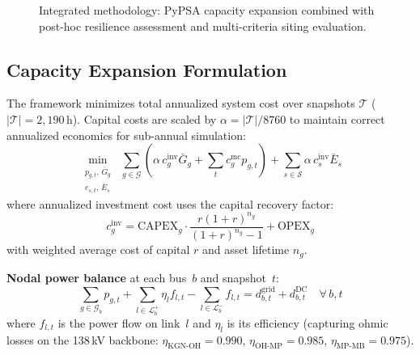 \documentclass[conference,10pt]{IEEEtran}
\begin{document}
\begin{figure}[htbp]
{
}
\caption{Integrated methodology: PyPSA capacity expansion combined with post-hoc resilience assessment and multi-criteria siting evaluation.}
\label{fig:workflow}
\end{figure}

\subsection{Capacity Expansion Formulation}

The framework minimizes total annualized system cost over snapshots $\mathcal{T}$ ($|\mathcal{T}| = 2{,}190$\,h). Capital costs are scaled by $\alpha = |\mathcal{T}|/8760$ to maintain correct annualized economics for sub-annual simulation:
\begin{equation}
\min_{\substack{p_{g,t},\, \bar{G}_g \\ e_{s,t},\, \bar{E}_s}} \;\sum_{g \in \mathcal{G}} \left(\alpha\, c_g^{\text{inv}} \bar{G}_g + \sum_{t} c_g^{\text{mc}} p_{g,t}\right) + \sum_{s \in \mathcal{S}} \alpha\, c_s^{\text{inv}} \bar{E}_s
\label{eq:obj}
\end{equation}
where annualized investment cost uses the capital recovery factor:
\begin{equation}
c_g^{\text{inv}} = \text{CAPEX}_g \cdot \frac{r(1+r)^{n_g}}{(1+r)^{n_g}-1} + \text{OPEX}_g
\label{eq:crf}
\end{equation}
with weighted average cost of capital $r$ and asset lifetime $n_g$.

\noindent\textbf{Nodal power balance} at each bus~$b$ and snapshot~$t$:
\begin{equation}
\sum_{g \in \mathcal{G}_b} p_{g,t} + \sum_{l \in \mathcal{L}_b^{+}} \eta_l f_{l,t} - \sum_{l \in \mathcal{L}_b^{-}} f_{l,t} = d_{b,t}^{\text{grid}} + d_{b,t}^{\text{DC}} \quad \forall\, b,t
\label{eq:balance}
\end{equation}
where $f_{l,t}$ is the power flow on link~$l$ and $\eta_l$ is its efficiency (capturing ohmic losses on the 138\,kV backbone: $\eta_{\text{KGN-OH}}=0.990$, $\eta_{\text{OH-MP}}=0.985$, $\eta_{\text{MP-MB}}=0.975$).
\end{document}
